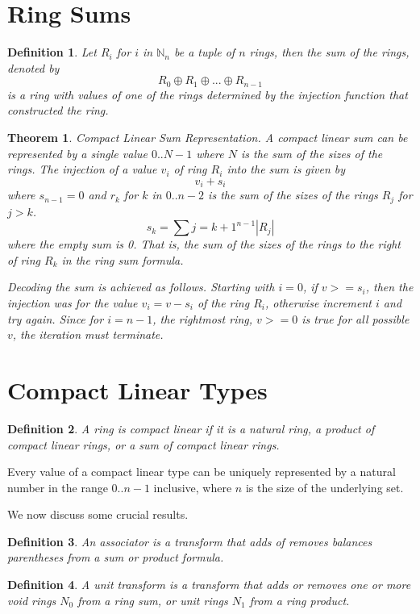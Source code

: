 \documentclass{article}
\newtheorem{theorem}{Theorem}
\newtheorem{definition}{Definition}
\begin{document}
\section{Ring Sums}
\begin{definition}
Let $R_i$ for $i$ in $\mathbb{N}_n$ be a tuple of $n$ rings, then the
{\em sum} of the rings, denoted by
$$R_0 \oplus R_1 \oplus ... \oplus R_{n-1}$$
is a ring with values of one of the rings determined
by the injection function that constructed the ring.
\end{definition}

\begin{theorem} {\em Compact Linear Sum Representation}.
A compact linear sum can be represented by a single value
$0..{N-1}$ where $N$ is the sum of the sizes of the rings.
The injection of a value $v_i$ of ring $R_i$ into the sum is given by
$$v_i + s_i$$
where $s_{n-1}=0$ and $r_k$ for $k$ in $0..n-2$ is the sum of the sizes of the rings
$R_j$ for $j>k$.
$$s_k = \sum{j=k+1}^{n-1} |R_j|$$
where the empty sum is 0. That is, the sum of the sizes of the rings
to the {\em right} of ring $R_k$ in the ring sum formula.


Decoding the sum is achieved as follows. Starting with $i=0$, if $v >= s_i$,
then the injection was for the value $v_i = v - s_i$ of the ring $R_i$, otherwise
increment $i$ and try again. Since for $i=n-1$, the rightmost ring, $v>=0$ is
true for all possible $v$, the iteration must terminate.
\end{theorem}

\section{Compact Linear Types}
\begin{definition}
A ring is compact linear if it is a natural ring, a product
of compact linear rings, or a sum of compact linear rings.
\end{definition}

Every value of a compact linear type can
be uniquely represented by a natural number in the range $0..n-1$ inclusive,
where $n$ is the size of the underlying set.

We now discuss some crucial results. 
\begin{definition}
An {\em associator} is a transform that adds of removes balances
parentheses from a sum or product formula.
\end{definition}

\begin{definition}
A {\em unit} transform is a transform that adds or removes one or more
void rings $N_0$ from a ring sum, or unit rings $N_1$ from
a ring product.
\end{definition}
\end{document}
